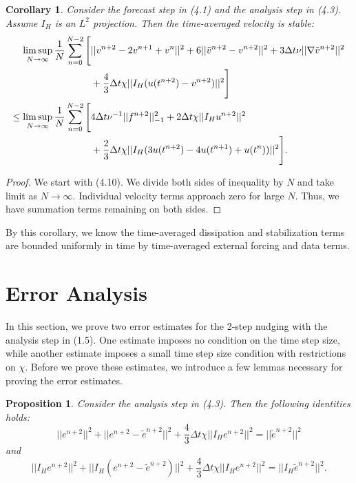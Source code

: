 \documentclass[11pt,a4paper]{article}
\newtheorem{corollary}{Corollary}[theorem]
\newtheorem{proposition}[theorem]{Proposition}
\begin{document}
\begin{corollary}
    Consider the forecast step in (4.1) and the analysis step in (4.3). Assume $I_H$ is an $L^2$ projection. Then the time-averaged velocity is stable:
    \begin{align}
        \limsup_{N\rightarrow \infty} \frac{1}{N} \sum_{n=0}^{N-2} \Bigg[&||v^{n+2}-2v^{n+1}+v^n||^2 +6||\Tilde{v}^{n+2}-v^{n+2}||^2 + 3\Delta t\nu||\nabla \Tilde{v}^{n+2}||^2 \notag \\
        &+\frac{4}{3}\Delta t\chi||I_H(u(t^{n+2})-v^{n+2})||^2 \Bigg] \notag \\
        \leq \limsup_{N\rightarrow \infty}\frac{1}{N} \sum_{n=0}^{N-2} \Bigg[&4\Delta t\nu^{-1}||f^{n+2}||_{-1}^2+2\Delta t\chi||I_Hu^{n+2}||^2 \\
        &+ \frac{2}{3}\Delta t\chi||I_H(3u(t^{n+2})-4u(t^{n+1})+u(t^n))||^2\Bigg]. \notag
    \end{align}
\end{corollary}
\begin{proof}
    We start with (4.10). We divide both sides of inequality by $N$ and take limit as $N\rightarrow \infty$. Individual velocity terms approach zero for large $N$. Thus, we have summation terms remaining on both sides.
\end{proof}
By this corollary, we know the time-averaged dissipation and stabilization terms are bounded uniformly in time by time-averaged external forcing and data terms.


\section{Error Analysis}
In this section, we prove two error estimates for the 2-step nudging with the analysis step in (1.5). One estimate imposes no condition on the time step size, while another estimate imposes a small time step size condition with restrictions on $\chi$. Before we prove these estimates, we introduce a few lemmas necessary for proving the error estimates.


\begin{proposition}
    Consider the analysis step in (4.3). Then the following identities holds:
    \begin{equation}
        ||e^{n+2}||^2+||e^{n+2}-\tilde{e}^{n+2}||^2+\frac{4}{3}\Delta t\chi ||I_He^{n+2}||^2= ||\tilde{e}^{n+2}||^2
    \end{equation}
    and
    \begin{equation}
        ||I_He^{n+2}||^2+||I_H(e^{n+2}-\tilde{e}^{n+2})||^2+\frac{4}{3}\Delta t\chi ||I_He^{n+2}||^2= ||I_H\tilde{e}^{n+2}||^2.
    \end{equation}
\end{proposition}
\end{document}

